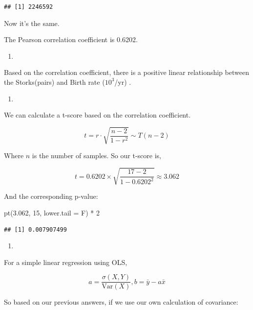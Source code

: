 \documentclass[
]{article}
\newenvironment{Shaded}{\begin{snugshade}}{\end{snugshade}}
\newcommand{\AttributeTok}[1]{\textcolor[rgb]{0.77,0.63,0.00}{#1}}
\newcommand{\DecValTok}[1]{\textcolor[rgb]{0.00,0.00,0.81}{#1}}
\newcommand{\FloatTok}[1]{\textcolor[rgb]{0.00,0.00,0.81}{#1}}
\newcommand{\FunctionTok}[1]{\textcolor[rgb]{0.00,0.00,0.00}{#1}}
\newcommand{\NormalTok}[1]{#1}
\newcommand{\SpecialCharTok}[1]{\textcolor[rgb]{0.00,0.00,0.00}{#1}}
\providecommand{\tightlist}{%
  \setlength{\itemsep}{0pt}\setlength{\parskip}{0pt}}
\begin{document}
\begin{verbatim}
## [1] 2246592
\end{verbatim}

Now it's the same.

The Pearson correlation coefficient is 0.6202.

\begin{enumerate}
\def\labelenumi{\roman{enumi})}
\setcounter{enumi}{1}
\tightlist
\item
\end{enumerate}

Based on the correlation coefficient, there is a positive linear
relationship between the Storks(pairs) and Birth rate (\(10^3\)/yr) .

\begin{enumerate}
\def\labelenumi{\roman{enumi})}
\setcounter{enumi}{2}
\tightlist
\item
\end{enumerate}

We can calculate a t-score based on the correlation coefficient.

\[
t = r \cdot \sqrt{\frac{n - 2}{1-r^2}} \sim T(n-2)
\]

Where \(n\) is the number of samples. So our t-score is,

\[
t = 0.6202 \times\sqrt{\frac{17 - 2}{1 - 0.6202^2}} \approx 3.062
\]

And the corresponding p-value:

\begin{Shaded}
\begin{Highlighting}[]
\FunctionTok{pt}\NormalTok{(}\FloatTok{3.062}\NormalTok{, }\DecValTok{15}\NormalTok{, }\AttributeTok{lower.tail =}\NormalTok{ F) }\SpecialCharTok{*} \DecValTok{2}
\end{Highlighting}
\end{Shaded}

\begin{verbatim}
## [1] 0.007907499
\end{verbatim}

\begin{enumerate}
\def\labelenumi{\roman{enumi})}
\setcounter{enumi}{3}
\tightlist
\item
\end{enumerate}

For a simple linear regression using OLS,

\[
a = \frac{\sigma(X,Y)}{\text{Var}(X)}, b = \bar y - a \bar x
\]

So based on our previous answers, if we use our own calculation of
covariance:
\end{document}
